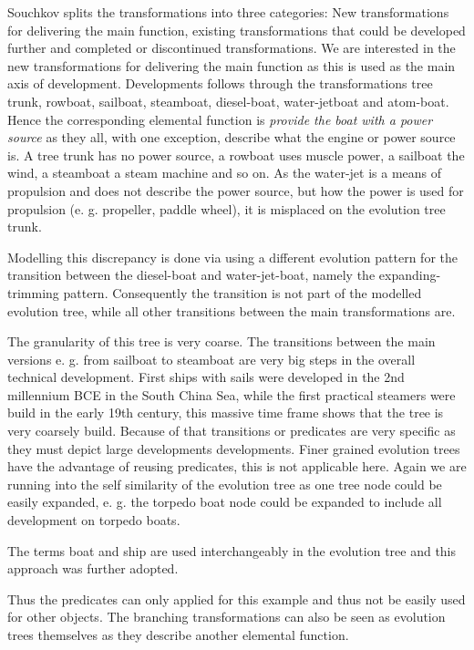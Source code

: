 \documentclass[11pt,a4paper]{article}
\begin{document}
Souchkov splits the transformations into three categories: New transformations
for delivering the main function, existing transformations that could be
developed further and completed or discontinued transformations. We are
interested in the new transformations for delivering the main function as this
is used as the main axis of development. Developments follows through the
transformations tree trunk, rowboat, sailboat, steamboat, diesel-boat,
water-jetboat and atom-boat. Hence the corresponding elemental function is
\textit{provide the boat with a power source} as they all, with one exception,
describe what the engine or power source is. A tree trunk has no power source,
a rowboat uses muscle power, a sailboat the wind, a steamboat a steam machine
and so on. As the water-jet is a means of propulsion and does not describe the
power source, but how the power is used for propulsion (e. g. propeller,
paddle wheel), it is misplaced on the evolution tree trunk.

Modelling this discrepancy is done via using a different evolution pattern for
the transition between the diesel-boat and water-jet-boat, namely the
expanding-trimming pattern. Consequently the transition is not part of the
modelled evolution tree, while all other transitions between the main
transformations are. 

The granularity of this tree is very coarse. The transitions between the main
versions e. g. from sailboat to steamboat are very big steps in the overall
technical development. First ships with sails were developed in the 2nd
millennium BCE in the South China Sea, while the first practical steamers were
build in the early 19th century, this massive time frame shows that the tree
is very coarsely build. Because of that transitions or predicates are very
specific as they must depict large developments developments. Finer grained
evolution trees have the advantage of reusing predicates, this is not
applicable here. Again we are running into the self similarity of the
evolution tree as one tree node could be easily expanded, e. g. the torpedo
boat node could be expanded to include all development on torpedo boats.

The terms boat and ship are used interchangeably in the evolution tree and
this approach was further adopted.

Thus the predicates can only applied for this example and thus not be easily
used for other objects. The branching transformations can also be seen as
evolution trees themselves as they describe another elemental function. 
\end{document}
